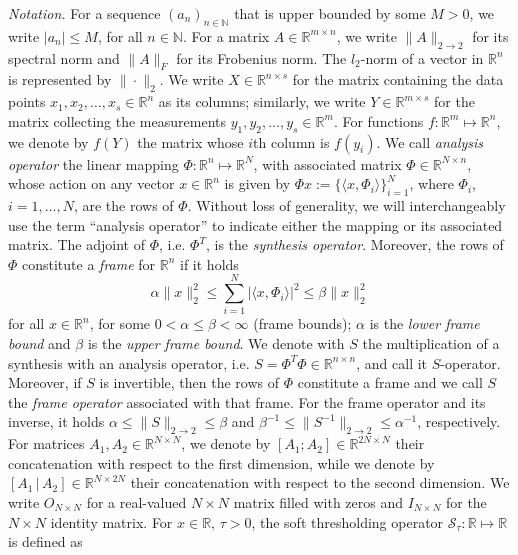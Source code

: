 \documentclass[preprint,12pt]{elsarticle}
\newcommand{\rn}{\mathbb{R}^n}
\newcommand{\rN}{\mathbb{R}^N}
\newcommand{\RNn}{\mathbb{R}^{N\times n}}
\newcommand{\st}{\mathcal{S}}\newcommand{\sgn}{\mathrm{sign}}
\newcommand{\opnorm}{2\rightarrow2}
\begin{document}
\noindent\textit{Notation.} For a sequence $(a_n)_{n\in\mathbb{N}}$ that is upper bounded by some $M>0$, we write $|a_n|\leq M$, for all $n\in\mathbb{N}$. For a matrix $A\in\mathbb{R}^{m\times n}$, we write $\|A\|_{\opnorm}$ for its spectral norm and $\|A\|_F$ for its Frobenius norm. The $l_2$-norm of a vector in $\rn$ is represented by $\|\cdot\|_2$. We write $X\in\mathbb{R}^{n\times s}$ for the matrix containing the data points $x_1,x_2,\hdots,x_s\in\rn$ as its columns; similarly, we write $Y\in\mathbb{R}^{m\times s}$ for the matrix collecting the measurements $y_1,y_2,\hdots,y_s\in\mathbb{R}^m$. For functions $f:\mathbb{R}^m\mapsto\rn$, we denote by $f(Y)$ the matrix whose $i$th column is $f(y_i)$. We call \textit{analysis operator} the linear mapping $\Phi:\rn\mapsto\rN$, with associated matrix $\Phi\in\RNn$, whose action on any vector $x\in\rn$ is given by $\Phi x:=\{\langle x,\Phi_i\rangle\}_{i=1}^N$, where $\Phi_i$, $i=1,\hdots,N$, are the rows of $\Phi$. Without loss of generality, we will interchangeably use the term ``analysis operator'' to indicate either the mapping or its associated matrix.
The adjoint of $\Phi$, i.e. $\Phi^T$, is the \textit{synthesis operator}. Moreover, the rows of $\Phi$ constitute a \textit{frame} for $\rn$ if it holds
    \begin{equation}
    \alpha\|x\|_2^2\leq\sum_{i=1}^N\lvert\langle x,\Phi_i\rangle\rvert^2\leq \beta \|x\|_2^2
\end{equation}
for all $x\in\rn$, for some $0<\alpha\leq\beta<\infty$ (frame bounds); $\alpha$ is the \emph{lower frame bound} and $\beta$ is the \textit{upper frame bound}. We denote with $S$ the multiplication of a synthesis with an analysis operator, i.e. $S=\Phi^T\Phi\in\mathbb{R}^{n\times n}$, and call it $S$-operator. Moreover, if $S$ is invertible, then the rows of $\Phi$ constitute a frame and we call $S$ the \emph{frame operator} associated with that frame. For the frame operator and its inverse, it holds $\alpha\leq\|S\|_{\opnorm}\leq \beta$ and $\beta^{-1}\leq\|S^{-1}\|_{\opnorm}\leq\alpha^{-1}$, respectively. For matrices $A_1,A_2\in\mathbb{R}^{N\times N}$, we denote by $[A_1;A_2]\in\mathbb{R}^{2N\times N}$ their concatenation with respect to the first dimension, while we denote by $[A_1\,|\,A_2]\in\mathbb{R}^{N\times 2N}$ their concatenation with respect to the second dimension. We write $O_{N\times N}$ for a real-valued $N\times N$ matrix filled with zeros and $I_{N\times N}$ for the $N\times N$ identity matrix. For $x\in\mathbb{R},\,\tau>0$, the soft thresholding operator $\st_\tau:\mathbb{R}\mapsto\mathbb{R}$ is defined as
\end{document}
